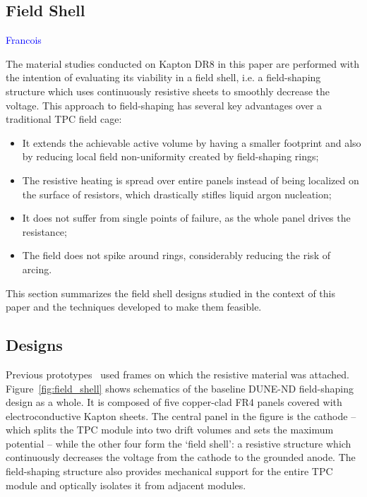 \documentclass[a4paper,12pt]{article}
\begin{document}


\subsection{Field Shell}
\label{sec:field_shell}
\textcolor{blue}{Francois}

The material studies conducted on Kapton DR8 in this paper are performed with the intention of evaluating its viability in a field shell, i.e. a field-shaping structure which uses continuously resistive sheets to smoothly decrease the voltage. This approach to field-shaping has several key advantages over a traditional TPC field cage:
\begin{itemize}
\item It extends the achievable active volume by having a smaller footprint and also by reducing local field non-uniformity created by field-shaping rings;
\item The resistive heating is spread over entire panels instead of being localized on the surface of resistors, which drastically stifles liquid argon nucleation;
\item It does not suffer from single points of failure, as the whole panel drives the resistance;
\item The field does not spike around rings, considerably reducing the risk of arcing.
\end{itemize}
This section summarizes the field shell designs studied in the context of this paper and the techniques developed to make them feasible.

\subsection{Designs}
Previous prototypes~\cite{bern_lartpc,srmu_tpc} used frames on which the resistive material was attached. Figure~\ref{fig:field_shell} shows schematics of the baseline DUNE-ND field-shaping design as a whole. It is composed of five copper-clad FR4 panels covered with electroconductive Kapton sheets. The central panel in the figure is the cathode -- which splits the TPC module into two drift volumes and sets the maximum potential -- while the other four form the `field shell': a resistive structure which continuously decreases the voltage from the cathode to the grounded anode. The field-shaping structure also provides mechanical support for the entire TPC module and optically isolates it from adjacent modules.
\end{document}
